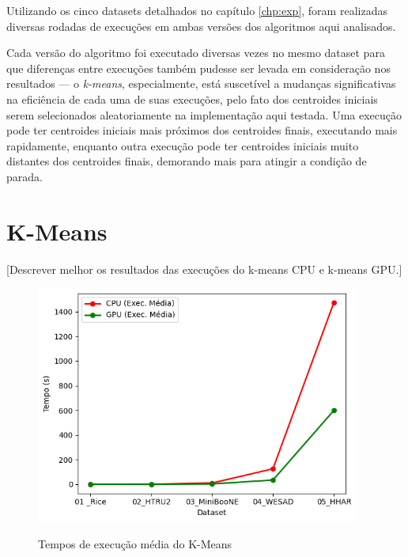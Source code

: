 \documentclass[12pt, %
openright, 
oneside, %
a4paper,    %
brazil]{facom-ufu-abntex2}
\begin{document}
Utilizando os cinco datasets detalhados no capítulo \ref{chp:exp}, foram realizadas diversas rodadas de execuções em ambas versões dos algoritmos aqui analisados.

Cada versão do algoritmo foi executado diversas vezes no mesmo dataset para que diferenças entre execuções também pudesse ser levada em consideração nos resultados — o \textit{k-means}, especialmente, está suscetível a mudanças significativas na eficiência de cada uma de suas execuções, pelo fato dos centroides iniciais serem selecionados aleatoriamente na implementação aqui testada. Uma execução pode ter centroides iniciais mais próximos dos centroides finais, executando mais rapidamente, enquanto outra execução pode ter centroides iniciais muito distantes dos centroides finais, demorando mais para atingir a condição de parada.



\section{K-Means}

[Descrever melhor os resultados das execuções do k-means CPU e k-means GPU.]

\begin{figure}[h]
  \caption{Tempos de execução média do K-Means}
  \centering
  \includegraphics[width=0.95\textwidth]{kMeansResultsAvg.png}
  \label{fig:kMeansAvg}
\end{figure}
\end{document}
